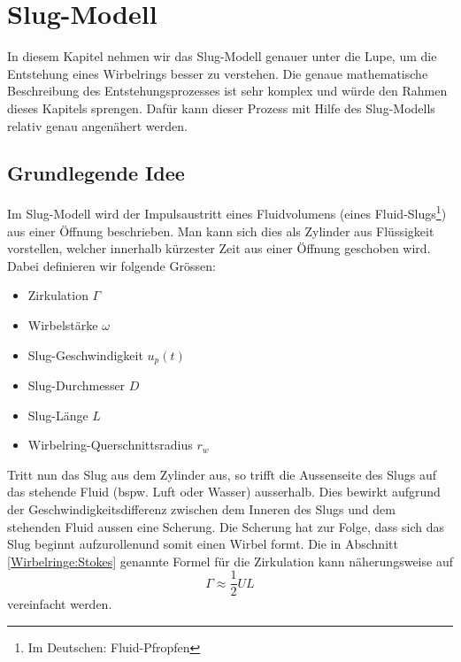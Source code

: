 %
%
%
\section{Slug-Modell}
In diesem Kapitel nehmen wir das Slug-Modell genauer unter die Lupe, um die Entstehung eines Wirbelrings besser zu verstehen.
Die genaue mathematische Beschreibung des Entstehungsprozesses ist sehr komplex und würde den Rahmen dieses Kapitels sprengen.
Dafür kann dieser Prozess mit Hilfe des Slug-Modells relativ genau angenähert werden.

\subsection{Grundlegende Idee}
Im Slug-Modell wird der Impulsaustritt eines Fluidvolumens (eines Fluid-Slugs\footnote{Im Deutschen: Fluid-Pfropfen}) aus einer Öffnung beschrieben.
Man kann sich dies als Zylinder aus Flüssigkeit vorstellen, welcher innerhalb kürzester Zeit aus einer Öffnung geschoben wird.
Dabei definieren wir folgende Grössen:
\begin{itemize}
    \item Zirkulation $\Gamma$
    \item Wirbelstärke $\omega$
    \item Slug-Geschwindigkeit $u_p(t)$
    \item Slug-Durchmesser $D$
    \item Slug-Länge $L$
    \item Wirbelring-Querschnittsradius $r_w$
\end{itemize}



Tritt nun das Slug aus dem Zylinder aus, so trifft die Aussenseite des Slugs auf das stehende Fluid (bspw. Luft oder Wasser) ausserhalb.
Dies bewirkt aufgrund der Geschwindigkeitsdifferenz zwischen dem Inneren des Slugs und dem stehenden Fluid aussen eine Scherung.
Die Scherung hat zur Folge, dass sich das Slug beginnt \glqq aufzurollen\grqq und somit einen Wirbel formt. 
Die in Abschnitt \ref{Wirbelringe:Stokes} genannte Formel für die Zirkulation kann näherungsweise auf
\begin{equation*}
\Gamma 
\approx 
\frac{1}{2}UL
\end{equation*}
vereinfacht werden.

